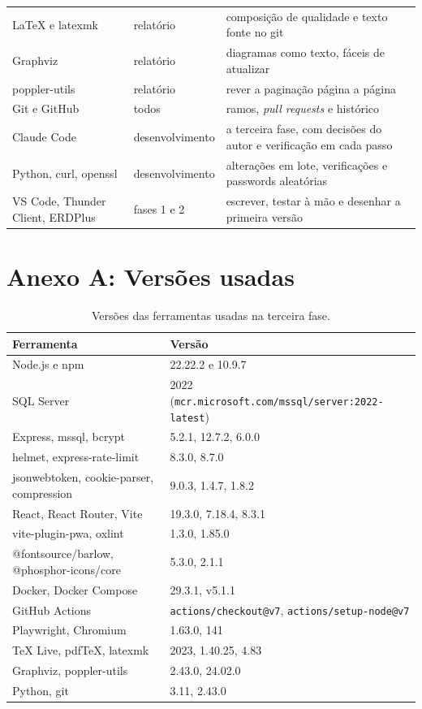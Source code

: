 \documentclass[a4paper,12pt]{article}
\begin{document}
\begin{xltabular}{\textwidth}{@{}>{\raggedright\arraybackslash}p{3.5cm}>{\raggedright\arraybackslash}p{2.8cm}L@{}}
LaTeX e latexmk & relatório & composição de qualidade e texto fonte no git \\
Graphviz & relatório & diagramas como texto, fáceis de atualizar \\
poppler-utils & relatório & rever a paginação página a página \\
Git e GitHub & todos & ramos, \textit{pull requests} e histórico \\
Claude Code & desenvolvimento & a terceira fase, com decisões do autor e verificação em cada passo \\
Python, curl, openssl & desenvolvimento & alterações em lote, verificações e passwords aleatórias \\
VS Code, Thunder Client, ERDPlus & fases 1 e 2 & escrever, testar à mão e desenhar a primeira versão \\
\end{xltabular}
\normalsize

\clearpage

\section*{Anexo A: Versões usadas}

\begin{table}[H]
\centering
\small
\begin{tabularx}{\textwidth}{@{}p{5cm}L@{}}
\toprule
\textbf{Ferramenta} & \textbf{Versão} \\
\midrule
Node.js e npm & 22.22.2 e 10.9.7 \\
SQL Server & 2022 (\texttt{mcr.microsoft.com/mssql/server:2022-latest}) \\
Express, mssql, bcrypt & 5.2.1, 12.7.2, 6.0.0 \\
helmet, express-rate-limit & 8.3.0, 8.7.0 \\
jsonwebtoken, cookie-parser, compression & 9.0.3, 1.4.7, 1.8.2 \\
React, React Router, Vite & 19.3.0, 7.18.4, 8.3.1 \\
vite-plugin-pwa, oxlint & 1.3.0, 1.85.0 \\
@fontsource/barlow, @phosphor-icons/core & 5.3.0, 2.1.1 \\
Docker, Docker Compose & 29.3.1, v5.1.1 \\
GitHub Actions & \texttt{actions/checkout@v7}, \texttt{actions/setup-node@v7} \\
Playwright, Chromium & 1.63.0, 141 \\
TeX Live, pdfTeX, latexmk & 2023, 1.40.25, 4.83 \\
Graphviz, poppler-utils & 2.43.0, 24.02.0 \\
Python, git & 3.11, 2.43.0 \\
\bottomrule
\end{tabularx}
\caption{Versões das ferramentas usadas na terceira fase.}
\label{tab:versoes}
\end{table}
\end{document}
